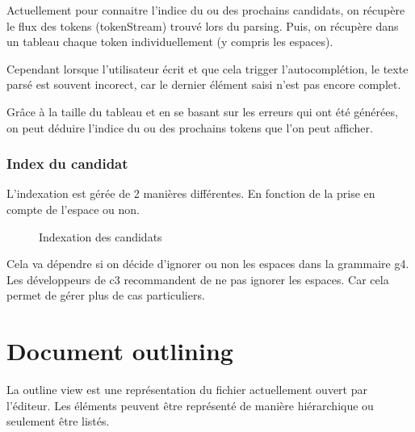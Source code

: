\documentclass[
    iict, %
    il, %
]{heig-tb}
\begin{document}
Actuellement pour connaitre l'indice du ou des prochains candidats, on récupère le flux des tokens (tokenStream) trouvé lors du parsing.
Puis, on récupère dans un tableau chaque token individuellement (y compris les espaces).

Cependant lorsque l'utilisateur écrit et que cela trigger l'autocomplétion, le texte parsé est souvent incorect, car le dernier élément saisi n'est pas encore complet.

Grâce à la taille du tableau et en se basant sur les erreurs qui ont été générées, on peut déduire l'indice du ou des prochains tokens que l'on peut afficher.

\subsubsection{Index du candidat}
L'indexation est gérée de 2 manières différentes. En fonction de la prise en compte de l'espace ou non.

\begin{figure}[!h]
    \begin{center}
    \end{center}
    \caption[Indexation des candidats]{\label{candidat-index} Indexation des candidats}
\end{figure}

Cela va dépendre si on décide d'ignorer ou non les espaces dans la grammaire g4.
Les développeurs de c3 recommandent de ne pas ignorer les espaces. Car cela permet de gérer plus de cas particuliers.

\section{Document outlining}


La outline view est une représentation du fichier actuellement ouvert par l'éditeur.
Les éléments peuvent être représenté de manière hiérarchique ou seulement être listés.
\end{document}
